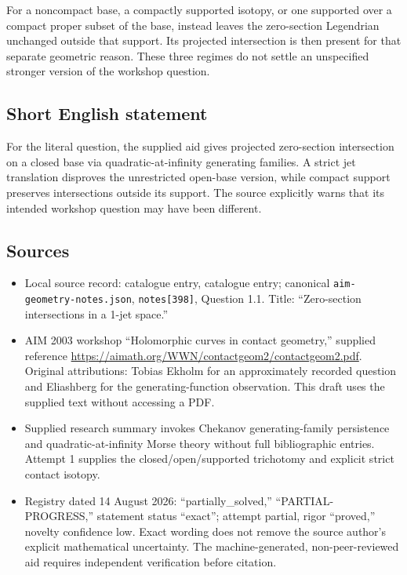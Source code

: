 \documentclass[11pt]{article}
\begin{document}
For a noncompact base, a compactly supported isotopy, or one supported over a compact proper subset of the base, instead leaves the zero-section Legendrian unchanged outside that support. Its projected intersection is then present for that separate geometric reason. These three regimes do not settle an unspecified stronger version of the workshop question.
\subsection{Short English statement}
For the literal question, the supplied aid gives projected zero-section intersection on a closed base via quadratic-at-infinity generating families. A strict jet translation disproves the unrestricted open-base version, while compact support preserves intersections outside its support. The source explicitly warns that its intended workshop question may have been different.
\subsection{Sources}
\begin{itemize}
\item Local source record: catalogue entry, catalogue entry; canonical \texttt{aim-geometry-notes.json}, \texttt{notes[398]}, Question 1.1. Title: ``Zero-section intersections in a 1-jet space.''
\item AIM 2003 workshop ``Holomorphic curves in contact geometry,'' supplied reference \url{https://aimath.org/WWN/contactgeom2/contactgeom2.pdf}. Original attributions: Tobias Ekholm for an approximately recorded question and Eliashberg for the generating-function observation. This draft uses the supplied text without accessing a PDF.
\item Supplied research summary invokes Chekanov generating-family persistence and quadratic-at-infinity Morse theory without full bibliographic entries. Attempt 1 supplies the closed/open/supported trichotomy and explicit strict contact isotopy.
\item Registry dated 14 August 2026: ``partially\_solved,'' ``PARTIAL-PROGRESS,'' statement status ``exact''; attempt partial, rigor ``proved,'' novelty confidence low. Exact wording does not remove the source author's explicit mathematical uncertainty. The machine-generated, non-peer-reviewed aid requires independent verification before citation.
\end{itemize}
\end{document}
